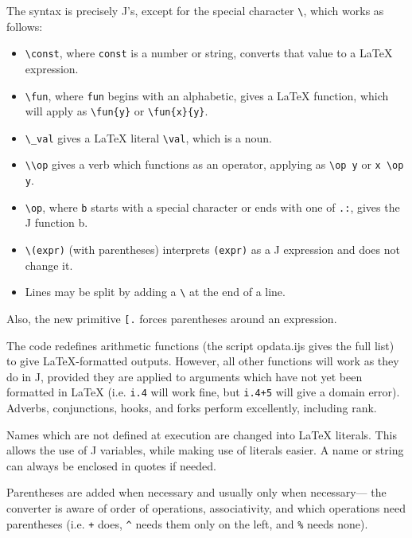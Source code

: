\documentclass{article}
\begin{document}
The syntax is precisely J's, except for the special character
\lstinline`\`, which works as follows:
\begin{itemize}
  \item \lstinline`\const`, where \lstinline`const` is a number or string,
    converts that value to a LaTeX expression.
  \item \lstinline`\fun`, where \lstinline`fun` begins with an alphabetic,
    gives a LaTeX function, which will apply as \lstinline`\fun{y}`
    or \lstinline`\fun{x}{y}`.
  \item \lstinline`\_val` gives a LaTeX literal \lstinline`\val`, which is a noun.
  \item \lstinline`\\op` gives a verb which functions as an operator,
    applying as \lstinline`\op y` or \lstinline`x \op y`.
  \item \lstinline`\op`, where \lstinline`b` starts with a special character or
    ends with one of \lstinline`.:`, gives the J function b.
  \item \lstinline`\(expr)` (with parentheses) interprets \lstinline`(expr)`
    as a J expression and does not change it.
  \item Lines may be split by adding a \lstinline`\` at the end of a line.
\end{itemize}

Also, the new primitive \lstinline`[.` forces parentheses around an expression.

The code redefines arithmetic functions (the script opdata.ijs gives the
full list) to give LaTeX-formatted outputs.
However, all other functions will work as they do in J, provided they are
applied to arguments which have not yet been formatted in LaTeX
(i.e. \lstinline`i.4` will work fine, but \lstinline`i.4+5` will give a domain
error).
Adverbs, conjunctions, hooks, and forks perform excellently, including
rank.

Names which are not defined at execution are changed into LaTeX literals.
This allows the use of J variables, while making use of literals easier. 
A name or string can always be enclosed in quotes if needed.

Parentheses are added when necessary and usually only when necessary---
the converter is aware of order of operations, associativity, and which
operations need parentheses (i.e. \lstinline`+` does, \lstinline`^` needs them
only on the left, and \lstinline`%` needs none).
\end{document}
